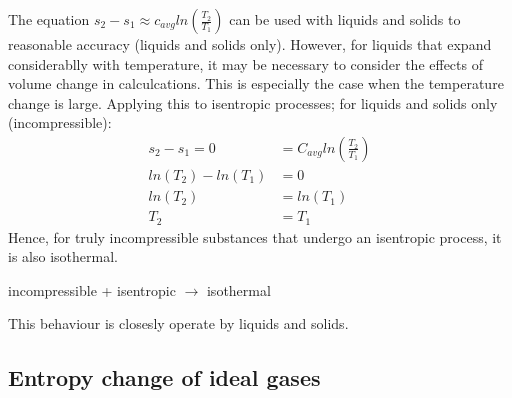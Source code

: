\documentclass[class=report, crop=false, 12pt,a4paper]{standalone}
\begin{document}
The equation \( s_2 - s_1 \approx c_{avg} ln(\frac{T_2}{T_1}) \) can be used with liquids and solids to reasonable accuracy (liquids and solids only). However, for liquids that expand considerablly with temperature, it may be necessary to consider the effects of volume change in calculcations. This is especially the case when the temperature change is large. Applying this to isentropic processes; for liquids and solids only (incompressible):
\begin{align*}
  s_2 - s_1 = 0 &= C_{avg} ln(\frac{T_2}{T_1})\\
  ln(T_2) - ln(T_1) &= 0 \\
  ln(T_2) &= ln(T_1)\\
  T_2 &= T_1
\end{align*}
Hence, for truly incompressible substances that undergo an isentropic process, it is also isothermal.
\begin{center}
  incompressible + isentropic \(\rightarrow\) isothermal
\end{center}
This behaviour is closesly operate by liquids and solids. 
\subsection{Entropy change of ideal gases}
\end{document}

